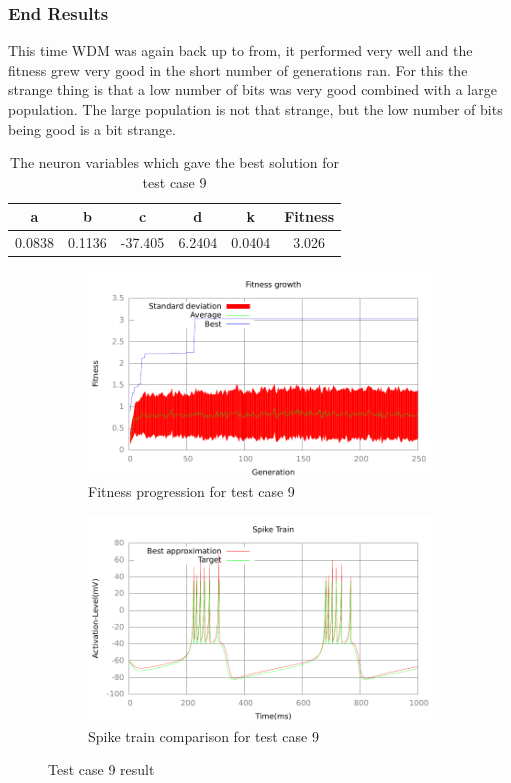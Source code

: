 \subsubsection{End Results}\label{sec:test-case-9-results}
This time WDM was again back up to from, it performed very well and the fitness
grew very good in the short number of generations ran. For this the strange
thing is that a low number of bits was very good combined with a large
population. The large population is not that strange, but the low number of bits
being good is a bit strange.
\begin{table}
	\begin{tabular}{c c c c c c}
		a & b & c & d & k & Fitness \\
		\hline
		0.0838 & 0.1136 & -37.405 & 6.2404 & 0.0404 & 3.026
	\end{tabular}
	\caption{The neuron variables which gave the best solution for test case
	9}
\end{table}
\begin{figure}[h]
	\centering
	\begin{subfigure}[b]{0.5\textwidth}
		\includegraphics[width=\textwidth]{../output/wdm_izzy_3_fitness.pdf}
		\caption{Fitness progression for test case 9}
		\label{fig:fitness-test-case-9}
	\end{subfigure}%
	\begin{subfigure}[b]{0.5\textwidth}
		\includegraphics[width=\textwidth]{../output/wdm_izzy_3_spike.pdf}
		\caption{Spike train comparison for test case 9}
		\label{fig:spike-test-case-9}
	\end{subfigure}
	\caption{Test case 9 result}
\end{figure}

